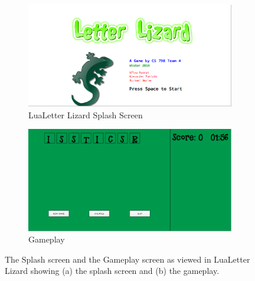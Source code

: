 \begin{figure}
    \centering
    \begin{subfigure}{0.49\textwidth}
        \includegraphics[width=\textwidth]{../screenshots/luasplash.png}
        \caption{LuaLetter Lizard Splash Screen}
        \label{luasplash}
    \end{subfigure}
    \begin{subfigure}{0.49\textwidth}
        \includegraphics[width=\textwidth]{../screenshots/luabegin.png}
        \caption{Gameplay}
        \label{luabegin}
    \end{subfigure}
    \caption{The Splash screen and the Gameplay screen as viewed in LuaLetter Lizard
    showing (a) the splash screen and (b) the gameplay.}
    \label{luascreenshots1}
\end{figure}

